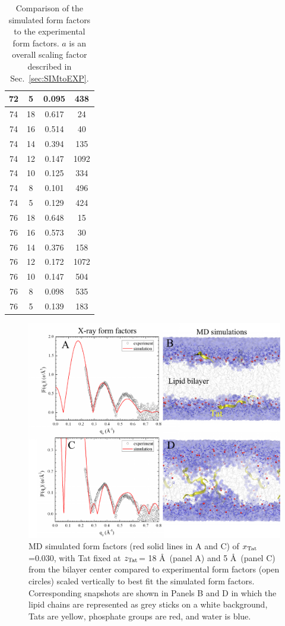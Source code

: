 \begin{table}[p]
\begin{tabular}{c c c c}
    72 & 5  & 0.095 & 438 \\
    \hline
    74 & 18 & 0.617 & 24   \\
    74 & 16 & 0.514 & 40   \\
    74 & 14 & 0.394 & 135  \\
    74 & 12 & 0.147	& 1092 \\
    74 & 10 & 0.125 & 334  \\
    74 & 8  & 0.101 & 496  \\
    74 & 5  & 0.129 & 424  \\
    \hline
    76 & 18 & 0.648 & 15   \\
    76 & 16 & 0.573	& 30   \\
    76 & 14 & 0.376 & 158  \\
    76 & 12 & 0.172 & 1072 \\
    76 & 10 & 0.147 & 504  \\
    76 & 8  & 0.098 & 535  \\
    76 & 5  & 0.139 & 183  \\
    \hline
  \end{tabular}
  \caption{Comparison of the simulated form factors to the 
  experimental form factors. $a$ is an overall scaling factor described in
  Sec.~\ref{sec:SIMtoEXP}.}
  \label{tab:MD_sim-exp}
\end{table}

\begin{figure}[htbp]
  \centering
  \includegraphics[width=\textwidth]{figures/Tat/MD_Results/pore}
  \caption{MD simulated form factors (red solid lines in A and C) of $x_\textrm{Tat}$=0.030,
  with Tat fixed at $z_\textrm{Tat}$= 18 \AA\ (panel A) and 5 \AA\ (panel C) from the bilayer center compared to
  experimental form factors (open circles) scaled vertically to best fit the
  simulated form factors. Corresponding snapshots are shown in Panels B and D in which the lipid chains are
  represented as grey sticks on a white background, Tats are yellow, phosphate groups are red, and
  water is blue.}
  \label{fig:figure4}
\end{figure}

